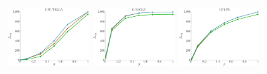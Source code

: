 \documentclass[a4paper]{report}
\newcommand{\wratio}{0.16}
\begin{document}
\vfill
\includegraphics[width=\wratio\textwidth]{influence/GNUTELLA/fs_gnutella}\hfill
\includegraphics[width=\wratio\textwidth]{influence/GOOGLE/fs_google}\hfill
\includegraphics[width=\wratio\textwidth]{influence/GPLUS/fs_gplus}\hfill
\end{document}
